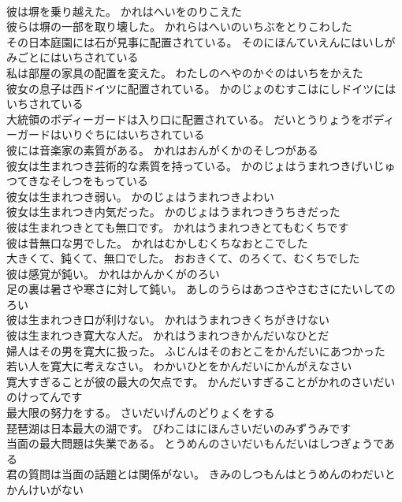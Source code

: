 \documentclass[8pt]{extreport}
\begin{document}
\begin{CJK}{UTF8}{min}
\\	彼は塀を乗り越えた。	かれはへいをのりこえた 
\\	彼らは塀の一部を取り壊した。	かれらはへいのいちぶをとりこわした 
\\	その日本庭園には石が見事に配置されている。	そのにほんていえんにはいしがみごとにはいちされている 
\\	私は部屋の家具の配置を変えた。	わたしのへやのかぐのはいちをかえた 
\\	彼女の息子は西ドイツに配置されている。	かのじょのむすこはにしドイツにはいちされている 
\\	大統領のボディーガードは入り口に配置されている。	だいとうりょうをボディーガードはいりぐちにはいちされている 
\\	彼には音楽家の素質がある。	かれはおんがくかのそしつがある 
\\	彼女は生まれつき芸術的な素質を持っている。	かのじょはうまれつきげいじゅつてきなそしつをもっている 
\\	彼女は生まれつき弱い。	かのじょはうまれつきよわい 
\\	彼女は生まれつき内気だった。	かのじょはうまれつきうちきだった 
\\	彼は生まれつきとても無口です。	かれはうまれつきとてもむくちです 
\\	彼は昔無口な男でした。	かれはむかしむくちなおとこでした 
\\	大きくて、鈍くて、無口でした。	おおきくて、のろくて、むくちでした 
\\	彼は感覚が鈍い。	かれはかんかくがのろい 
\\	足の裏は暑さや寒さに対して鈍い。	あしのうらはあつさやさむさにたいしてのろい 
\\	彼は生まれつき口が利けない。	かれはうまれつきくちがきけない 
\\	彼は生まれつき寛大な人だ。	かれはうまれつきかんだいなひとだ 
\\	婦人はその男を寛大に扱った。	ふじんはそのおとこをかんだいにあつかった 
\\	若い人を寛大に考えなさい。	わかいひとをかんだいにかんがえなさい 
\\	寛大すぎることが彼の最大の欠点です。	かんだいすぎることがかれのさいだいのけってんです 
\\	最大限の努力をする。	さいだいげんのどりょくをする 
\\	琵琶湖は日本最大の湖です。	びわこはにほんさいだいのみずうみです 
\\	当面の最大問題は失業である。	とうめんのさいだいもんだいはしつぎょうである 
\\	君の質問は当面の話題とは関係がない。	きみのしつもんはとうめんのわだいとかんけいがない 

\end{CJK}
\end{document}
